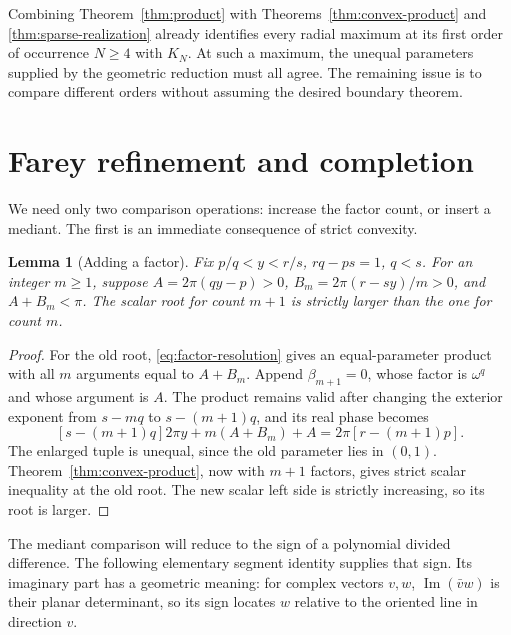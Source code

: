 \documentclass[11pt,a4paper]{article}
\newtheorem{lemma}[theorem]{Lemma}
\theoremstyle{definition}
\theoremstyle{remark}
\numberwithin{equation}{section}
\begin{document}
Combining Theorem~\ref{thm:product} with Theorems~\ref{thm:convex-product} and \ref{thm:sparse-realization} already identifies every radial maximum at its first order of occurrence $N\ge4$ with $K_N$.
At such a maximum, the unequal parameters supplied by the geometric reduction must all agree.
The remaining issue is to compare different orders without assuming the desired boundary theorem.

\section{Farey refinement and completion}
We need only two comparison operations: increase the factor count, or insert a mediant.
The first is an immediate consequence of strict convexity.

\begin{lemma}[Adding a factor]\label{lem:add-factor}
Fix $p/q<y<r/s$, $rq-ps=1$, $q<s$.
For an integer $m\ge1$, suppose
$A=2\pi(qy-p)>0$, $B_m=2\pi(r-sy)/m>0$, and $A+B_m<\pi$.
The scalar root for count $m+1$ is strictly larger than the one for count $m$.
\end{lemma}
\begin{proof}
For the old root, \eqref{eq:factor-resolution} gives an equal-parameter product with all $m$ arguments equal to $A+B_m$.
Append $\beta_{m+1}=0$, whose factor is $\omega^q$ and whose argument is $A$.
The product remains valid after changing the exterior exponent from $s-mq$ to $s-(m+1)q$, and its real phase becomes
\[
 [s-(m+1)q]2\pi y+m(A+B_m)+A=2\pi[r-(m+1)p].
\]
The enlarged tuple is unequal, since the old parameter lies in $(0,1)$.
Theorem~\ref{thm:convex-product}, now with $m+1$ factors, gives strict scalar inequality at the old root.
The new scalar left side is strictly increasing, so its root is larger.
\end{proof}

The mediant comparison will reduce to the sign of a polynomial divided
difference. The following elementary segment identity supplies that sign.
Its imaginary part has a geometric meaning: for complex vectors $v,w$,
$\operatorname{Im}(\bar v w)$ is their planar determinant, so its sign
locates $w$ relative to the oriented line in direction $v$.
\end{document}

